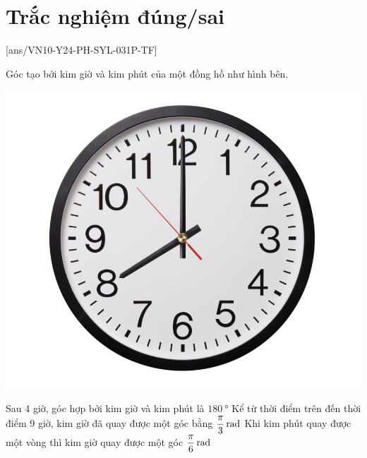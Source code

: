 \section{Trắc nghiệm đúng/sai}
\setcounter{ex}{0}
[ans/VN10-Y24-PH-SYL-031P-TF]
\begin{ex}
Góc tạo bởi kim giờ và kim phút của một đồng hồ như hình bên.
\begin{center}
	\includegraphics[scale=0.15]{../figs/VN10-Y24-PH-SYL-031P-1}
\end{center} 	
	{Sau 4 giờ, góc hợp bởi kim giờ và kim phút là $\SI{180}{\degree}$}
	{Kể từ thời điểm trên đến thời điểm 9 giờ, kim giờ đã quay được một góc bằng $\xsi{\dfrac{\pi}{3}}{\radian}$}
	{\True Khi kim phút quay được một vòng thì kim giờ quay được một góc $\xsi{\dfrac{\pi}{6}}{\radian}$}
\end{ex}
